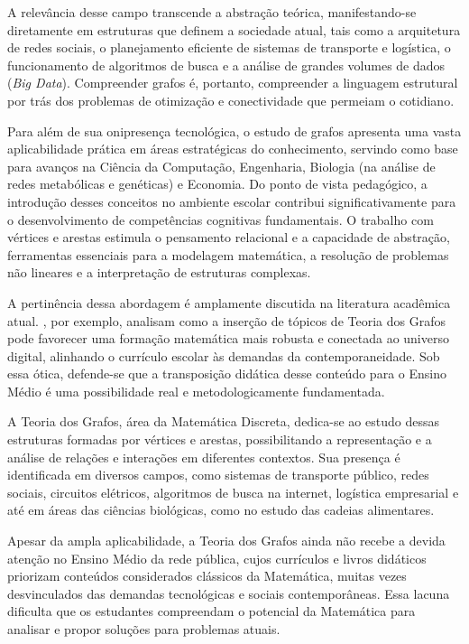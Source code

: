 \documentclass[
  12pt,
  oneside,
  a4paper,
  english,
  brazilian
  ]{abntex2}
\theoremstyle{definition}
\begin{document}
A relevância desse campo transcende a abstração teórica, manifestando-se
diretamente em estruturas que definem a sociedade atual, tais como a arquitetura
de redes sociais, o planejamento eficiente de sistemas de transporte e logística,
o funcionamento de algoritmos de busca e a análise de grandes volumes de dados
(\textit{Big Data}). Compreender grafos é, portanto, compreender a linguagem
estrutural por trás dos problemas de otimização e conectividade que permeiam o
cotidiano.

Para além de sua onipresença tecnológica, o estudo de grafos apresenta uma vasta
aplicabilidade prática em áreas estratégicas do conhecimento, servindo como base
para avanços na Ciência da Computação, Engenharia, Biologia (na análise de redes
metabólicas e genéticas) e Economia. Do ponto de vista pedagógico, a introdução
desses conceitos no ambiente escolar contribui significativamente para o
desenvolvimento de competências cognitivas fundamentais. O trabalho com vértices
e arestas estimula o pensamento relacional e a capacidade de abstração,
ferramentas essenciais para a modelagem matemática, a resolução de problemas não
lineares e a interpretação de estruturas complexas.

A pertinência dessa abordagem é amplamente discutida na literatura acadêmica
atual. \textcite{rodrigues2021}, por exemplo, analisam como a inserção de
tópicos de Teoria dos Grafos pode favorecer uma formação matemática mais robusta
e conectada ao universo digital, alinhando o currículo escolar às demandas da
contemporaneidade. Sob essa ótica, defende-se que a transposição didática desse
conteúdo para o Ensino Médio é uma possibilidade real e metodologicamente
fundamentada.

A Teoria dos Grafos, área da Matemática Discreta, dedica-se ao estudo dessas
estruturas formadas por vértices e arestas, possibilitando a representação e a
análise de relações e interações em diferentes contextos. Sua presença é
identificada em diversos campos, como sistemas de transporte público, redes
sociais, circuitos elétricos, algoritmos de busca na internet, logística
empresarial e até em áreas das ciências biológicas, como no estudo das cadeias
alimentares.

Apesar da ampla aplicabilidade, a Teoria dos Grafos ainda não recebe a devida
atenção no Ensino Médio da rede pública, cujos currículos e livros didáticos
priorizam conteúdos considerados clássicos da Matemática, muitas vezes
desvinculados das demandas tecnológicas e sociais contemporâneas. Essa lacuna
dificulta que os estudantes compreendam o potencial da Matemática para analisar e
propor soluções para problemas atuais.
\end{document}
